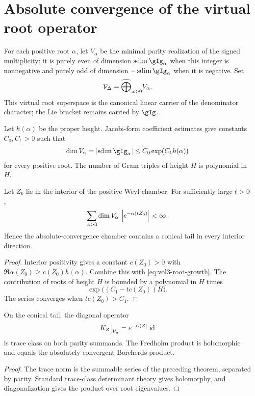 \chapter{Absolute convergence of the virtual root operator}
For each positive root $\alpha$, let $V_\alpha$ be the minimal parity realization of the signed multiplicity: it is purely even of dimension $\sdim\gIg_\alpha$ when this integer is nonnegative and purely odd of dimension $-\sdim\gIg_\alpha$ when it is negative.  Set
\[
 \mathcal V_\Delta=\widehat\bigoplus_{\alpha>0}V_\alpha.
\]
This virtual root superspace is the canonical linear carrier of the denominator character; the Lie bracket remains carried by $\gIg$.

Let $h(\alpha)$ be the proper height.  Jacobi-form coefficient estimates give constants $C_0,C_1>0$ such that
\begin{equation}\label{eq:vol3-root-growth}
 \dim V_\alpha=\abs{\sdim\gIg_\alpha}\le C_0\exp(C_1h(\alpha))
\end{equation}
for every positive root.  The number of Gram triples of height $H$ is polynomial in $H$.

\begin{theorem}
Let $Z_0$ lie in the interior of the positive Weyl chamber.  For sufficiently large $t>0$,
\[
 \sum_{\alpha>0}\dim V_\alpha\,
 \left|e^{-\alpha(tZ_0)}\right|<\infty.
\]
Hence the absolute-convergence chamber contains a conical tail in every interior direction.
\end{theorem}
\begin{proof}
Interior positivity gives a constant $c(Z_0)>0$ with
$\Re\alpha(Z_0)\ge c(Z_0)h(\alpha)$.
Combine this with \eqref{eq:vol3-root-growth}.  The contribution of roots of height $H$ is bounded by a polynomial in $H$ times
\[
 \exp\bigl((C_1-tc(Z_0))H\bigr).
\]
The series converges when $tc(Z_0)>C_1$.
\end{proof}

\begin{corollary}
On the conical tail, the diagonal operator
\[
 K_Z\big|_{V_\alpha}=e^{-\alpha(Z)}\operatorname{id}
\]
is trace class on both parity summands.  The Fredholm product is holomorphic and equals the absolutely convergent Borcherds product.
\end{corollary}
\begin{proof}
The trace norm is the summable series of the preceding theorem, separated by parity.  Standard trace-class determinant theory gives holomorphy, and diagonalization gives the product over root eigenvalues.
\end{proof}


